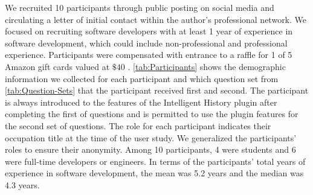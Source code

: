 We recruited 10 participants through public posting on social media and circulating a letter of initial contact within the author's professional network.
We focused on recruiting software developers with at least 1 year of experience in software development, which could include non-professional and professional experience.
Participants were compensated with entrance to a raffle for 1 of 5 Amazon gift cards valued at $\$40$ .
\autoref{tab:Participants} shows the demographic information we collected for each participant and which question set from \autoref{tab:Question-Sets} that the participant received first and second.
The participant is always introduced to the features of the Intelligent History plugin after completing the first of questions and is permitted to use the plugin features for the second set of questions.
The role for each participant indicates their occupation title at the time of the user study.
We generalized the participants' roles to ensure their anonymity.
Among 10 participants, 4 were students and 6 were full-time developers or engineers.
In terms of the participants' total years of experience in software development, the mean was 5.2 years and the median was 4.3 years.


